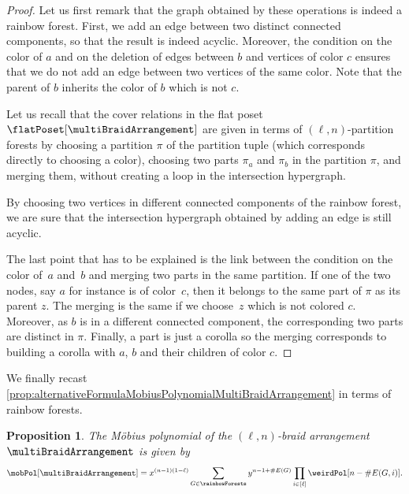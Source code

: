 \documentclass{amsart}
\newtheorem{proposition}[theorem]{Proposition}
\theoremstyle{definition}
\newtheorem{example}[theorem]{Example}
\newcommand{\card}[1]{\##1} %
\begin{document}

\begin{proof}
Let us first remark that the graph obtained by these operations is indeed a rainbow forest.
First, we add an edge between two distinct connected components, so that the result is indeed acyclic.
Moreover, the condition on the color of $a$ and on the deletion of edges between $b$ and vertices of color $c$ ensures that we do not add an edge between two vertices of the same color.
Note that the parent of $b$ inherits the color of $b$ which is not $c$.

Let us recall that the cover relations in the flat poset~$\flatPoset[\multiBraidArrangement]$ are given in terms of $(\ell,n)$-partition forests by choosing a partition $\pi$ of the partition tuple (which corresponds directly to choosing a color), choosing two parts $\pi_a$ and $\pi_b$ in the partition $\pi$, and merging them, without creating a loop in the intersection hypergraph.

By choosing two vertices in different connected components of the rainbow forest, we are sure that the intersection hypergraph obtained by adding an edge is still acyclic.

The last point that has to be explained is the link between the condition on the color of~$a$ and~$b$ and merging two parts in the same partition.
If one of the two nodes, say $a$ for instance is of color~$c$, then it belongs to the same part of $\pi$ as its parent $z$.
The merging is the same if we choose~$z$ which is not colored $c$.
Moreover, as $b$ is in a different connected component, the corresponding two parts are distinct in $\pi$.
Finally, a part is just a corolla so the merging corresponds to building a corolla with $a$, $b$ and their children of color $c$.
\end{proof}

We finally recast \cref{prop:alternativeFormulaMobiusPolynomialMultiBraidArrangement} in terms of rainbow forests.

\begin{proposition} 
The M\"obius polynomial of the $(\ell,n)$-braid arrangement~$\multiBraidArrangement$ is given by
\[
\mobPol[\multiBraidArrangement] = x^{(n-1)(1-\ell)} \sum_{G \in \rainbowForests} y^{n-1+\card{E(G)}}  \prod_{i \in [\ell]} \weirdPol[n-\card{E(G,i)}].
\]
\end{proposition}
\end{document}

